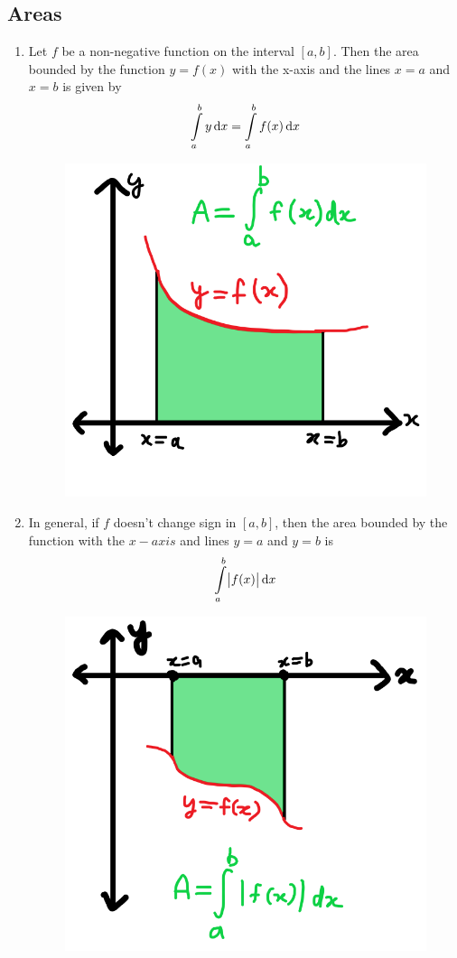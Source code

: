 \documentclass[14]{article}
\theoremstyle{definition}
\theoremstyle{case}
\begin{document}
\subsection{Areas}
\begin{enumerate}
\item Let $f$ be a non-negative function on the interval $[a, b]$. Then the area bounded by the function $y=f(x)$ with the x-axis and the lines $x = a$ and $x = b$ is given by
\[\int\limits_a^b y \dif x = \int\limits_a^b f(x) \dif x\]
\begin{figure}[h]\centering
\includegraphics[scale=.4]{images/int_areas_nonneg}
\end{figure}
\item In general, if $f$ doesn't change sign in $[a, b]$, then the area bounded by the function with the $x-axis$ and lines $y=a$ and $y=b$ is 
\[\int\limits_a^b \abs{f(x)} \dif x\]
\begin{figure}[h]\centering
\includegraphics[scale=.4]{images/int_areas_general_no_sign_change}

\end{figure}
\end{enumerate}
\end{document}
